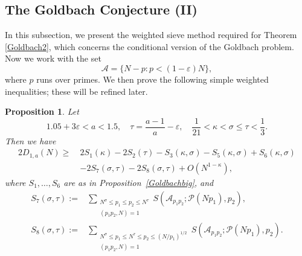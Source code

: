 \documentclass[12pt, a4paper]{amsart}
\def\le{\leqslant}
\def\ge{\geqslant}
\theoremstyle{plain}
\newtheorem{proposition}{Proposition}[section]
\theoremstyle{remark}
\numberwithin{equation}{section}
\begin{document}
\subsection{The Goldbach Conjecture (II)}
In this subsection, we present the weighted sieve method required for Theorem \ref{Goldbach2}, which concerns the conditional version of the Goldbach problem. Now we work with the set
\begin{equation}\label{Def/A=Goldbach2}
\mathscr{A}=\{N-p:p<(1-\varepsilon)N\}, 
\end{equation}
where \(p\) runs over primes. We then prove the following simple weighted inequalities; these will be refined later.




\begin{proposition}\label{Goldbachsmall}
Let 
$$
1.05+3\varepsilon<a<1.5,\quad \tau=\dfrac{a-1}{a}-\varepsilon, \quad 
\frac{1}{21}<\kappa<\sigma\le \tau< \frac{1}{3}. 
$$ 
Then we have
		\begin{equation}\label{Goldbachsmallw2}
		\begin{split}
		2D_{1,a}(N)\ge\ & 2S_1(\kappa)-2S_2(\tau)-S_3(\kappa,\sigma)-S_5(\kappa,\sigma)+S_6(\kappa,\sigma)\\
		&-2S_7(\sigma,\tau)-2S_8(\sigma,\tau)+O(N^{1-\kappa}),
		\end{split}
		\end{equation}
where $S_1, \ldots, S_6$ are as in Proposition~\ref{Goldbachbig}, and 
\begin{equation}
\begin{split}
S_{7}(\sigma,\tau):=&\sum_{\substack{N^\sigma \le p_1 \le p_2 \le N^\tau \\ (p_1 p_2, N) = 1}}  S(\mathscr{A}_{p_1 p_2}; \mathscr{P}(N p_1), p_2), \\
S_{8}(\sigma,\tau):=&\sum_{\substack{N^\sigma \le p_1 \le N^\tau\le p_2 \le (N/p_1)^{1/2} \\ (p_1 p_2, N) = 1}}  S(\mathscr{A}_{p_1 p_2}; \mathscr{P}(N p_1), p_2). 
\end{split}
\end{equation}
\end{proposition}
	
\end{document}
